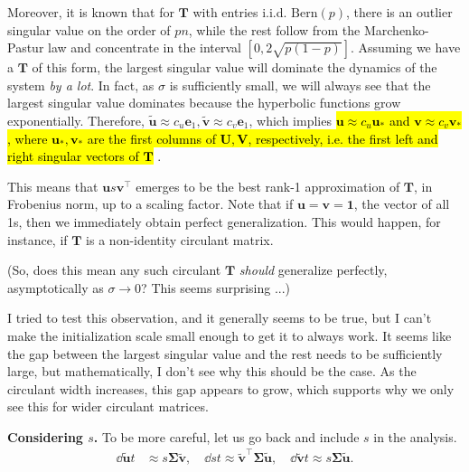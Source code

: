 \documentclass{article}
\begin{document}
Moreover, it is known that for $\bm{T}$ with entries i.i.d. $\text{Bern}(p)$, there is an outlier singular value on the order of $p n$, while the rest follow from the Marchenko-Pastur law and concentrate in the interval $[0, 2 \sqrt{p(1-p)}]$.
Assuming we have a $\bm{T}$ of this form, the largest singular value will dominate the dynamics of the system \emph{by a lot}.
In fact, as $\sigma$ is sufficiently small, we will always see that the largest singular value dominates because the hyperbolic functions grow exponentially.
Therefore, $\tilde{\bm{u}} \approx c_u \bm{e}_1, \tilde{\bm{v}} \approx c_v \bm{e}_1$, which implies \hl{ $\bm{u} \approx c_u \bm{u}_*$ and $\bm{v} \approx c_v \bm{v}_*$, where $\bm{u}_*, \bm{v}_*$ are the first columns of $\bm{U}, \bm{V}$, respectively, i.e. the first left and right singular vectors of $\bm{T}$ }.

This means that $\bm{u} s \bm{v}^\top$ emerges to be the best rank-1 approximation of $\bm{T}$, in Frobenius norm, up to a scaling factor.
Note that if $\bm{u} = \bm{v} = \bm{1}$, the vector of all 1s, then we immediately obtain perfect generalization.
This would happen, for instance, if $\bm{T}$ is a non-identity circulant matrix.

(So, does this mean any such circulant $\bm{T}$ \emph{should} generalize perfectly, asymptotically as $\sigma\to0$?
This seems surprising ...)

I tried to test this observation, and it generally seems to be true, but I can't make the initialization scale small enough to get it to always work.
It seems like the gap between the largest singular value and the rest needs to be sufficiently large, but mathematically, I don't see why this should be the case.
As the circulant width increases, this gap appears to grow, which supports why we only see this for wider circulant matrices.

\textbf{Considering $s$.}
To be more careful, let us go back and include $s$ in the analysis.
\begin{align*}
    \dd{\tilde{\bm{u}}}{t} &\approx s \bm{\Sigma} \tilde{\bm{v}}, \quad
    \dd{s}{t} \approx \tilde{\bm{v}}^\top \bm{\Sigma} \tilde{\bm{u}}, \quad
    \dd{\tilde{\bm{v}}}{t} \approx s \bm{\Sigma} \tilde{\bm{u}}.
\end{align*}

\end{document}
